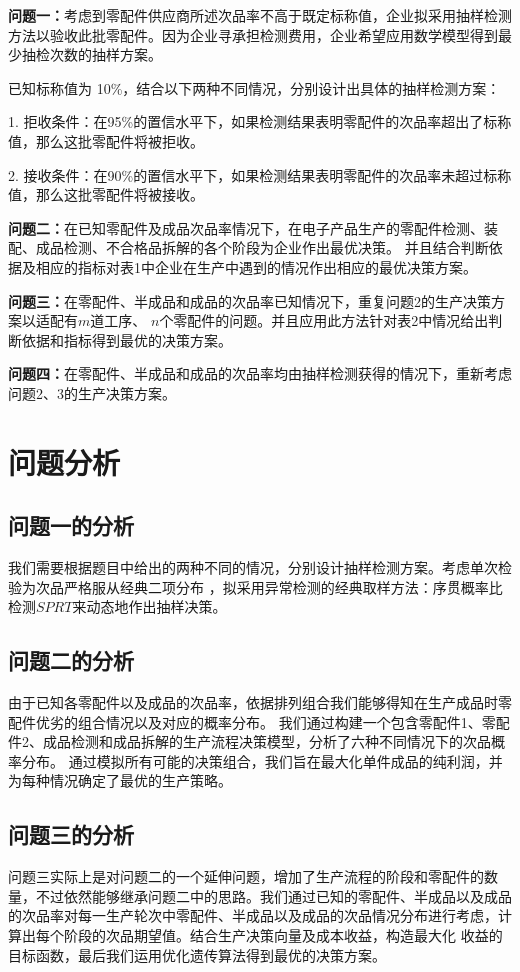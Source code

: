 \documentclass[withoutpreface,bwprint]{cumcmthesis} %
\begin{document}
\textbf{问题一：}考虑到零配件供应商所述次品率不高于既定标称值，企业拟采用抽样检测方法以验收此批零配件。因为企业寻承担检测费用，企业希望应用数学模型得到最少抽检次数的抽样方案。

已知标称值为 10\%，结合以下两种不同情况，分别设计出具体的抽样检测方案：

1. 拒收条件：在95\%的置信水平下，如果检测结果表明零配件的次品率超出了标称值，那么这批零配件将被拒收。

2. 接收条件：在90\%的置信水平下，如果检测结果表明零配件的次品率未超过标称值，那么这批零配件将被接收。

\textbf{问题二：}在已知零配件及成品次品率情况下，在电子产品生产的零配件检测、装配、成品检测、不合格品拆解的各个阶段为企业作出最优决策。
并且结合判断依据及相应的指标对表1中企业在生产中遇到的情况作出相应的最优决策方案。

\textbf{问题三：}在零配件、半成品和成品的次品率已知情况下，重复问题2的生产决策方案以适配有$m$道工序、
$n$个零配件的问题。并且应用此方法针对表2中情况给出判断依据和指标得到最优的决策方案。

\textbf{问题四：}在零配件、半成品和成品的次品率均由抽样检测获得的情况下，重新考虑问题2、3的生产决策方案。
\section{问题分析}
\subsection{问题一的分析}
我们需要根据题目中给出的两种不同的情况，分别设计抽样检测方案。考虑单次检验为次品严格服从经典二项分布
，拟采用异常检测的经典取样方法：序贯概率比检测$SPRT$来动态地作出抽样决策。
\subsection{问题二的分析}
由于已知各零配件以及成品的次品率，依据排列组合我们能够得知在生产成品时零配件优劣的组合情况以及对应的概率分布。
我们通过构建一个包含零配件1、零配件2、成品检测和成品拆解的生产流程决策模型，分析了六种不同情况下的次品概率分布。
通过模拟所有可能的决策组合，我们旨在最大化单件成品的纯利润，并为每种情况确定了最优的生产策略。
\subsection{问题三的分析}
问题三实际上是对问题二的一个延伸问题，增加了生产流程的阶段和零配件的数量，不过依然能够继承问题二中的思路。我们通过已知的零配件、半成品以及成品
的次品率对每一生产轮次中零配件、半成品以及成品的次品情况分布进行考虑，计算出每个阶段的次品期望值。结合生产决策向量及成本收益，构造最大化
收益的目标函数，最后我们运用优化遗传算法得到最优的决策方案。
\end{document}

